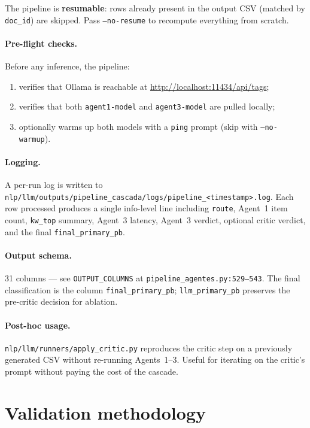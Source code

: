 \documentclass[11pt,a4paper]{article}
\begin{document}
The pipeline is \textbf{resumable}: rows already present in the output CSV (matched by \texttt{doc\_id}) are skipped. Pass \texttt{--no-resume} to recompute everything from scratch.

\paragraph{Pre-flight checks.} Before any inference, the pipeline:
\begin{enumerate}\itemsep0pt
\item verifies that Ollama is reachable at \url{http://localhost:11434/api/tags};
\item verifies that both \texttt{agent1-model} and \texttt{agent3-model} are pulled locally;
\item optionally warms up both models with a \texttt{ping} prompt (skip with \texttt{--no-warmup}).
\end{enumerate}

\paragraph{Logging.} A per-run log is written to \texttt{nlp/llm/outputs/pipeline\_cascada/logs/pipeline\_<timestamp>.log}. Each row processed produces a single info-level line including \texttt{route}, Agent~1 item count, \texttt{kw\_top} summary, Agent~3 latency, Agent~3 verdict, optional critic verdict, and the final \texttt{final\_primary\_pb}.

\paragraph{Output schema.} 31 columns --- see \texttt{OUTPUT\_COLUMNS} at \texttt{pipeline\_agentes.py:529--543}. The final classification is the column \texttt{final\_primary\_pb}; \texttt{llm\_primary\_pb} preserves the pre-critic decision for ablation.

\paragraph{Post-hoc usage.} \texttt{nlp/llm/runners/apply\_critic.py} reproduces the critic step on a previously generated CSV without re-running Agents~1--3. Useful for iterating on the critic's prompt without paying the cost of the cascade.

\section{Validation methodology}
\end{document}
